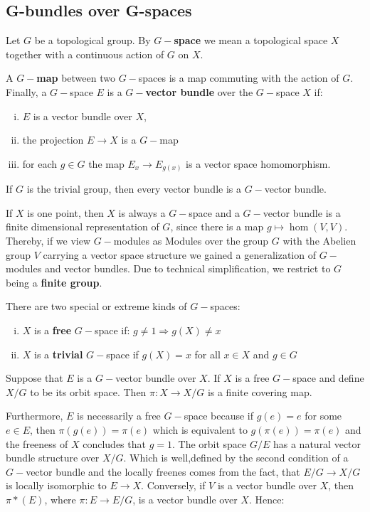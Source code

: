 \subsection{G-bundles over G-spaces}
\begin{definition}[G-space]
	Let $G$ be a topological group. By \textbf{$G-$space} we mean a topological space $X$ together with a continuous action of $G$ on $X$.
	
	A $G-$\textbf{map} between two $G-$spaces is a map commuting with the action of $G$. Finally, 
	a $G-$space $E$ is a \textbf{$G-$vector bundle }over the $G-$space $X$ if:
	\begin{enumerate}[(i)]
		\item $E$ is a vector bundle over $X$,
		\item the projection $E\to X$ is a $G-$map
		\item for each $g\in G$ the map $E_x\to E_{g(x)}$ is a vector space homomorphism.
	\end{enumerate}
\end{definition}
\begin{example}
	If $G$ is the trivial group, then every vector bundle is a $G-$vector bundle.
	
	If $X$ is one point, then $X$ is always a $G-$space and a $G-$vector bundle is a finite dimensional representation of $G$, since there is a map $g\mapsto \hom(V,V)$.
	Thereby, if we view $G-$modules as Modules over the group $G$ with the Abelien group $V$ carrying a vector space structure we gained a generalization of $G-$modules and vector bundles. Due to technical simplification, we restrict to $G$ being a \textbf{finite group}.
\end{example}
\begin{definition}
	There are two special or extreme kinds of $G-$spaces:
	\begin{enumerate}[(i)]
		\item $X$ is a \textbf{free} $G-$space if: $g\neq 1\Rightarrow g(X)\neq x$
		\item $X$ is a \textbf{trivial} $G-$space if $g(X)=x$ for all $x\in X$ and $g\in G$
	\end{enumerate}
\end{definition}
\begin{corollary} Suppose that $E$ is a $G-$vector bundle over $X$.
	If $X$ is a free $G-$space and define $X\slash G$ to be its orbit space. Then $\pi: X\to X\slash G$ is a finite covering map. 
	
	
	Furthermore, $E$ is necessarily a free $G-$space because if $g(e)=e$ for some $e\in E$, then $\pi(g(e))=\pi(e)$ which is equivalent to $g(\pi(e))=\pi(e)$ and the freeness of $X$ concludes that $g=1$. The orbit space $G\slash E$ has a natural vector bundle structure over $X\slash G$. Which is well,defined by the second condition of a $G-$vector bundle and the locally freenes comes from the fact, that $E\slash G \to X\slash G$ is locally isomorphic to $E\to X$. Conversely, if $V$ is a vector bundle over $X$, then $\pi*(E)$, where $\pi: E\to E\slash G$, is a vector bundle over $X$. Hence:
\end{corollary}
